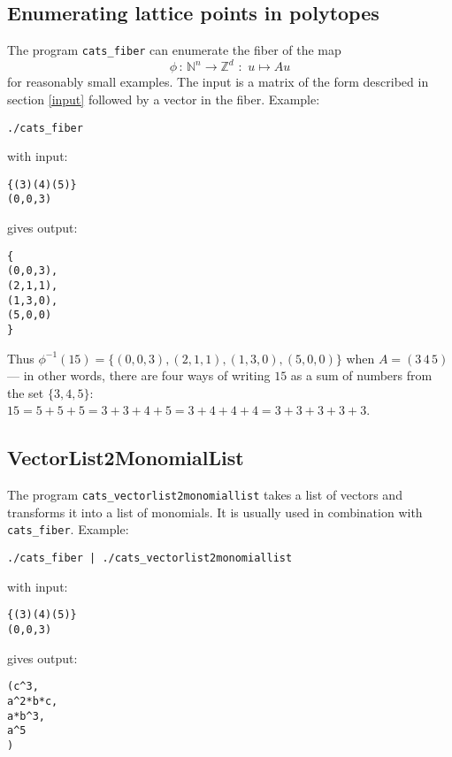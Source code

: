 \subsection{Enumerating lattice points in polytopes}
\label{cats_fiber}
The program {\tt cats\_fiber} can enumerate the fiber of the map
$$\phi \, : \, \mathbb N^n \rightarrow \mathbb Z^d \,\, : \,\, u
\mapsto Au$$
for reasonably small examples. The input is a matrix of
the form described in section \ref{input} followed by a vector in the
fiber. Example:
\begin{verbatim}
./cats_fiber
\end{verbatim}
with input:
\begin{verbatim}
{(3)(4)(5)}
(0,0,3)
\end{verbatim}
gives output:
\begin{verbatim}
{
(0,0,3),
(2,1,1),
(1,3,0),
(5,0,0)
}
\end{verbatim}
Thus $\phi^{-1}(15) = \{(0,0,3), (2,1,1), (1,3,0), (5,0,0)\}$ when $A
= (3\,4\,5)$ --- in other words, there are four ways of writing $15$
as a sum of numbers from the set $\{3,4,5\}$:
$15=5+5+5=3+3+4+5=3+4+4+4=3+3+3+3+3$.

\subsection{VectorList2MonomialList}
\label{cats_vectorlist2monomiallist}
The program {\tt cats\_vectorlist2monomiallist} takes a list of
vectors and transforms it into a list of monomials. It is usually used
in combination with {\tt cats\_fiber}.
\noindent
Example:
\begin{verbatim}
./cats_fiber | ./cats_vectorlist2monomiallist
\end{verbatim}
with input:
\begin{verbatim}
{(3)(4)(5)}
(0,0,3)
\end{verbatim}
gives output:
\begin{verbatim}
(c^3,
a^2*b*c,
a*b^3,
a^5
)
\end{verbatim}

